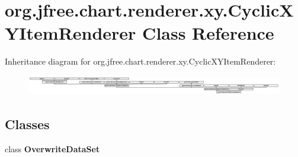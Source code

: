 \hypertarget{classorg_1_1jfree_1_1chart_1_1renderer_1_1xy_1_1_cyclic_x_y_item_renderer}{}\section{org.\+jfree.\+chart.\+renderer.\+xy.\+Cyclic\+X\+Y\+Item\+Renderer Class Reference}
\label{classorg_1_1jfree_1_1chart_1_1renderer_1_1xy_1_1_cyclic_x_y_item_renderer}
Inheritance diagram for org.\+jfree.\+chart.\+renderer.\+xy.\+Cyclic\+X\+Y\+Item\+Renderer\+:\begin{figure}[H]
\begin{center}
\leavevmode
\includegraphics[height=0.872274cm]{classorg_1_1jfree_1_1chart_1_1renderer_1_1xy_1_1_cyclic_x_y_item_renderer}
\end{center}
\end{figure}
\subsection*{Classes}
\begin{DoxyCompactItemize}
\item 
class {\bfseries Overwrite\+Data\+Set}
\end{DoxyCompactItemize}

